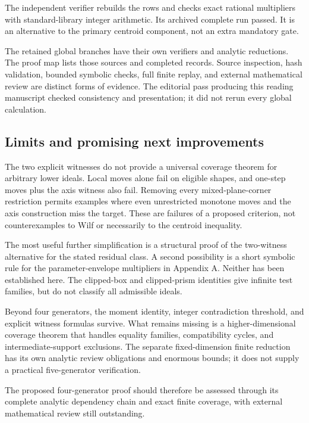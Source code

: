 \documentclass[
  11pt,
  a4paper,
]{article}
\begin{document}
The independent verifier rebuilds the rows and checks exact rational
multipliers with standard-library integer arithmetic. Its archived
complete run passed. It is an alternative to the primary centroid
component, not an extra mandatory gate.

The retained global branches have their own verifiers and analytic
reductions. The proof map lists those sources and completed records.
Source inspection, hash validation, bounded symbolic checks, full finite
replay, and external mathematical review are distinct forms of evidence.
The editorial pass producing this reading manuscript checked consistency
and presentation; it did not rerun every global calculation.

\hypertarget{limits-and-promising-next-improvements}{%
\subsection{Limits and promising next
improvements}\label{limits-and-promising-next-improvements}}

The two explicit witnesses do not provide a universal coverage theorem
for arbitrary lower ideals. Local moves alone fail on eligible shapes,
and one-step moves plus the axis witness also fail. Removing every
mixed-plane-corner restriction permits examples where even unrestricted
monotone moves and the axis construction miss the target. These are
failures of a proposed criterion, not counterexamples to Wilf or
necessarily to the centroid inequality.

The most useful further simplification is a structural proof of the
two-witness alternative for the stated residual class. A second
possibility is a short symbolic rule for the parameter-envelope
multipliers in Appendix A. Neither has been established here. The
clipped-box and clipped-prism identities give infinite test families,
but do not classify all admissible ideals.

Beyond four generators, the moment identity, integer contradiction
threshold, and explicit witness formulas survive. What remains missing
is a higher-dimensional coverage theorem that handles equality families,
compatibility cycles, and intermediate-support exclusions. The separate
fixed-dimension finite reduction has its own analytic review obligations
and enormous bounds; it does not supply a practical five-generator
verification.

The proposed four-generator proof should therefore be assessed through
its complete analytic dependency chain and exact finite coverage, with
external mathematical review still outstanding.
\end{document}
